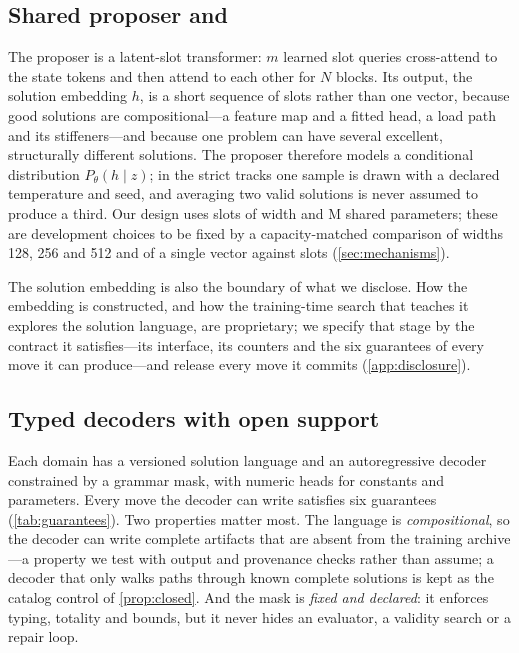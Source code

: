 \subsection{Shared proposer and \texorpdfstring{}{solution\_embedding}}

The proposer is a latent-slot transformer: $m$ learned slot queries cross-attend to the state tokens and
then attend to each other for $N$ blocks. Its output, the solution embedding $h$, is a short sequence
of slots rather than one vector, because good solutions are compositional---a feature map and a fitted
head, a load path and its stiffeners---and because one problem can have several excellent, structurally
different solutions. The proposer therefore models a conditional distribution $P_\theta(h\mid z)$; in
the strict tracks one sample is drawn with a declared temperature and seed, and averaging two valid
solutions is never assumed to produce a third. Our design uses \syn[EZ-G21]{\EZslots} slots of width
\syn[EZ-G21]{\EZslotDim} and \syn[EZ-G21]{\EZparamShared}M shared parameters; these are development
choices to be fixed by a capacity-matched comparison of widths 128, 256 and 512 and of a single vector
against slots (\cref{sec:mechanisms}).

The solution embedding is also the boundary of what we disclose. How the embedding is constructed,
and how the training-time search that teaches it explores the solution language, are proprietary; we
specify that stage by the contract it satisfies---its interface, its counters and the six guarantees of
every move it can produce---and release every move it commits (\cref{app:disclosure}).

\subsection{Typed decoders with open support}

Each domain has a versioned solution language and an autoregressive decoder constrained by a grammar
mask, with numeric heads for constants and parameters. Every move the decoder can write satisfies six
guarantees (\cref{tab:guarantees}). Two properties matter most. The language is
\emph{compositional}, so the decoder can write complete artifacts that are absent from the training
archive---a property we test with output and provenance checks rather than assume; a decoder that only
walks paths through known complete solutions is kept as the catalog control of
\cref{prop:closed}. And the mask is \emph{fixed and declared}: it enforces typing, totality and bounds,
but it never hides an evaluator, a validity search or a repair loop.

